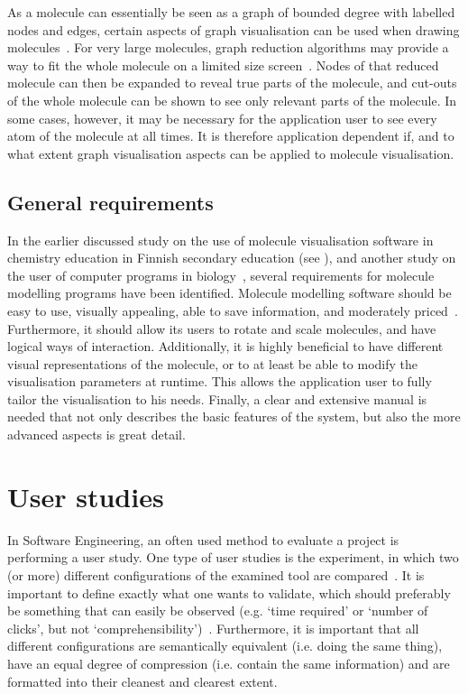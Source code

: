 As a molecule can essentially be seen as a graph of bounded degree with labelled nodes and edges, certain aspects of graph visualisation can be used when drawing molecules~\cite{boissonnat2001structure}. For very large molecules, graph reduction algorithms may provide a way to fit the whole molecule on a limited size screen~\cite{batagelj2004pajek}. Nodes of that reduced molecule can then be expanded to reveal true parts of the molecule, and cut-outs of the whole molecule can be shown to see only relevant parts of the molecule. In some cases, however, it may be necessary for the application user to see every atom of the molecule at all times. It is therefore application dependent if, and to what extent graph visualisation aspects can be applied to molecule visualisation.

\subsection{General requirements}
In the earlier discussed study on the use of molecule visualisation software in chemistry education in Finnish secondary education (see ), and another study on the user of computer programs in biology~\cite{taylor2013interface}, several requirements for molecule modelling programs have been identified. Molecule modelling software should be easy to use, visually appealing, able to save information, and moderately priced~\cite{aksela2008computer}. Furthermore, it should allow its users to rotate and scale molecules, and have logical ways of interaction. Additionally, it is highly beneficial to have different visual representations of the molecule, or to at least be able to modify the visualisation parameters at runtime. This allows the application user to fully tailor the visualisation to his needs. Finally, a clear and extensive manual is needed that not only describes the basic features of the system, but also the more advanced aspects is great detail.


\section{User studies}
In Software Engineering, an often used method to evaluate a project is performing a user study. One type of user studies is the experiment, in which two (or more) different configurations of the examined tool are compared~\cite{wohlin2003empirical}. It is important to define exactly what one wants to validate, which should preferably be something that can easily be observed (e.g. `time required' or `number of clicks', but not `comprehensibility')~\cite{stein2009assessing}. Furthermore, it is important that all different configurations are semantically equivalent (i.e. doing the same thing), have an equal degree of compression (i.e. contain the same information) and are formatted into their cleanest and clearest extent.

